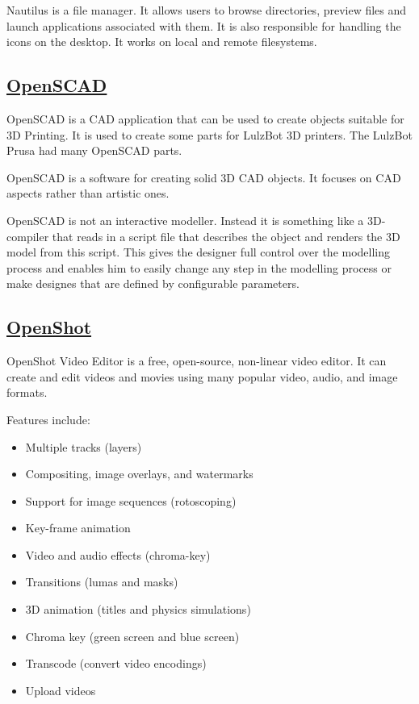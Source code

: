  Nautilus is a file manager. It allows users
 to browse directories, preview files and launch applications associated
 with them. It is also responsible for handling the icons on the
 desktop. It works on local and remote filesystems.
 
\subsection{\href{http://openscad.org/}{OpenSCAD}}

OpenSCAD is a CAD application that can be used to create objects suitable for
3D Printing. It is used to create some parts for LulzBot 3D printers. The
LulzBot Prusa had many OpenSCAD parts.

 OpenSCAD is a software for creating solid 3D CAD objects. It focuses on CAD
 aspects rather than artistic ones.
 
 OpenSCAD is not an interactive modeller. Instead it is something like a
 3D-compiler that reads in a script file that describes the object and renders
 the 3D model from this script. This gives the designer full control over the
 modelling process and enables him to easily change any step in the modelling
 process or make designes that are defined by configurable parameters.

\subsection{\href{http://www.openshotvideo.com/}{OpenShot}}

 OpenShot Video Editor is a free, open-source, non-linear video editor. It
 can create and edit videos and movies using many popular video, audio, and
 image formats.
 
 Features include:

\begin{itemize}
 \item Multiple tracks (layers)
 \item Compositing, image overlays, and watermarks
 \item Support for image sequences (rotoscoping)
 \item Key-frame animation
 \item Video and audio effects (chroma-key)
 \item Transitions (lumas and masks)
 \item 3D animation (titles and physics simulations)
 \item Chroma key (green screen and blue screen)
 \item Transcode (convert video encodings)
 \item Upload videos
\end{itemize}


